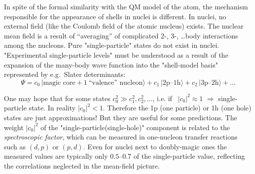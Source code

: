 \documentclass[11pt,a4paper]{article}
\newcommand{\spwell}{%
  \fill[gray!12] (-1.8,0) rectangle (1.8,0.45);
  \fill[blue!7] plot[domain=-1.8:1.8,samples=81] (\x,{Uw(\x)}) -- (1.8,0) -- (-1.8,0) -- cycle;
  \draw[gray] (-1.8,0) -- (1.8,0);
  \draw[very thick,blue!60!black] plot[domain=-1.8:1.8,samples=81] (\x,{Uw(\x)});}
\newcommand{\splev}[3][occlev]{%
  \pgfmathsetmacro\xt{xw(#2)}\draw[#1] (-\xt,#2) -- (\xt,#2);
  \foreach \s [count=\n] in {#3} {\xdef\spN{\n}}%
  \foreach \s [count=\k] in {#3} \node[\s] at ({0.32*(\k-(\spN+1)/2)},#2) {};}
\newcommand{\spempty}[1]{\pgfmathsetmacro\xt{xw(#1)}\draw[emptylev] (-\xt,#1) -- (\xt,#1);}
\newcommand{\spcore}{\splev{-2.7}{core,core}\splev{-2.3}{core,core,core,core}}
\begin{document}
\par
In spite of the formal similarity with the QM model of the atom, the mechanism responsible for the appearance of shells in nuclei is different. In nuclei, no external field (like the Coulomb field of the atomic nucleus) exists. The nuclear mean field is a result of ``averaging'' of complicated 2-, 3-, \dots body interactions among the nucleons. Pure "single-particle" states do not exist in nuclei. "Experimental single-particle levels" must be understood as a result of the expansion of the many-body wave function into the "shell-model basis" represented by e.g.\ Slater determinants:
\[
\Psi=c_0\,\big|\text{magic core}+1\ \text{``valence'' nucleon}\big\rangle
+c_1\,\big|2\text{p--}1\text{h}\big\rangle
+c_2\,\big|3\text{p--}2\text{h}\big\rangle+\dots
\]
\begin{center}
\end{center}

One may hope that for some states $c_0^2\gg c_1^2,c_2^2,\dots$, i.e. if \ $|c_0|^2\approx1$ $\Rightarrow$ single-particle state. In reality $|c_0|^2<1$. Therefore the 1p (one particle) or 1h (one hole) states are just approximations! But they are useful for some predictions.
The weight $|c_0|^2$ of the "single-particle(single-hole)" component is related to the \emph{spectroscopic factor}, which can be measured in one-nucleon transfer reactions such as $(d,p)$ or $(p,d)$. Even for nuclei next to doubly-magic ones the measured values are typically only $0.5$--$0.7$ of the single-particle value, reflecting the correlations neglected in the mean-field picture.
\end{document}
